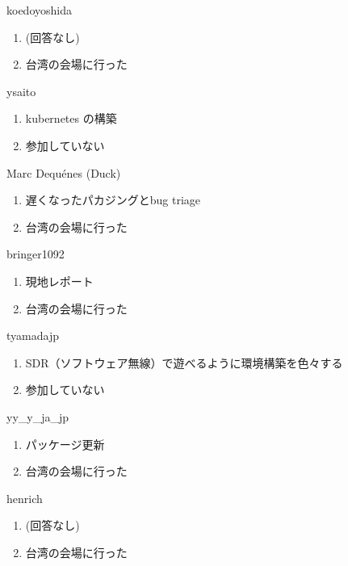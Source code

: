 \begin{prework}{ koedoyoshida }
  \begin{enumerate}
  \item (回答なし)
  \item 台湾の会場に行った
  \end{enumerate}
\end{prework}

\begin{prework}{ ysaito }
  \begin{enumerate}
  \item kubernetes の構築
  \item 参加していない
  \end{enumerate}
\end{prework}

\begin{prework}{ Marc Dequ\'enes (Duck) }
  \begin{enumerate}
  \item 遅くなったパカジングとbug triage
  \item 台湾の会場に行った
  \end{enumerate}
\end{prework}

\begin{prework}{ bringer1092 }
  \begin{enumerate}
  \item 現地レポート
  \item 台湾の会場に行った
  \end{enumerate}
\end{prework}

\begin{prework}{ tyamadajp }
  \begin{enumerate}
  \item SDR（ソフトウェア無線）で遊べるように環境構築を色々する
  \item 参加していない
  \end{enumerate}
\end{prework}

\begin{prework}{ yy\_y\_ja\_jp }
  \begin{enumerate}
  \item パッケージ更新
  \item 台湾の会場に行った
  \end{enumerate}
\end{prework}

\begin{prework}{ henrich }
  \begin{enumerate}
  \item (回答なし)
  \item 台湾の会場に行った
  \end{enumerate}
\end{prework}

